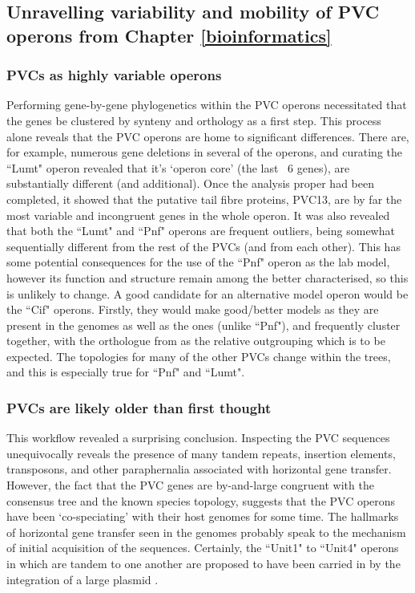 \subsection{Unravelling variability and mobility of PVC operons from Chapter \ref{bioinformatics}} 
\subsubsection{PVCs as highly variable operons}
Performing gene-by-gene phylogenetics within the PVC operons necessitated that the genes be clustered by synteny and orthology as a first step. This process alone reveals that the PVC operons are home to significant differences. There are, for example, numerous gene deletions in several of the operons, and curating the ``Lumt" operon revealed that it's `operon core' (the last ~6 genes), are substantially different (and additional). Once the analysis proper had been completed, it showed that the putative tail fibre proteins, PVC13, are by far the most variable and incongruent genes in the whole operon. It was also revealed that both the ``Lumt" and ``Pnf" operons are frequent outliers, being somewhat sequentially different from the rest of the PVCs (and from each other). This has some potential consequences for the use of the ``Pnf" operon as the lab model, however its function and structure remain among the better characterised, so this is unlikely to change. A good candidate for an alternative model operon would be the ``Cif" operons. Firstly, they would make good/better models as they are present in the \Plum{} genomes as well as the \Pasy{} ones (unlike ``Pnf"), and frequently cluster together, with the orthologue from \Plum{} as the relative outgrouping which is to be expected. The topologies for many of the other PVCs change within the trees, and this is especially true for ``Pnf" and ``Lumt".

\subsubsection{PVCs are likely older than first thought}
This workflow revealed a surprising conclusion. Inspecting the PVC sequences unequivocally reveals the presence of many tandem repeats, insertion elements, transposons, and other paraphernalia associated with horizontal gene transfer. However, the fact that the PVC genes are by-and-large congruent with the consensus tree and the known species topology, suggests that the PVC operons have been `co-speciating' with their host genomes for some time. The hallmarks of horizontal gene transfer seen in the genomes probably speak to the mechanism of initial acquisition of the sequences. Certainly, the ``Unit1" to ``Unit4" operons in \Plum{} which are tandem to one another are proposed to have been carried in by the integration of a large plasmid \citep{Yang2006}.

